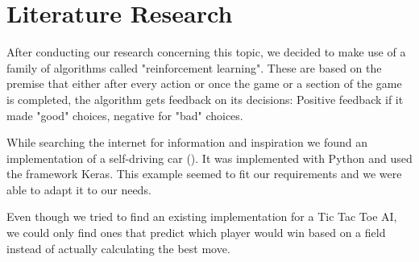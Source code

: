 \section{Literature Research}
After conducting our research concerning this topic, we decided to make use of a family of algorithms called "reinforcement learning". These are based on the premise that either after every action or once the game or a section of the game is completed, the algorithm gets feedback on its decisions: Positive feedback if it made "good" choices, negative for "bad" choices.

While searching the internet for information and inspiration we found an implementation of a self-driving car (\cite{Harvey17}). It was implemented with Python and used the framework Keras. This example seemed to fit our requirements and we were able to adapt it to our needs.

Even though we tried to find an existing implementation for a Tic Tac Toe AI, we could only find ones that predict which player would win based on a field instead of actually calculating the best move.

